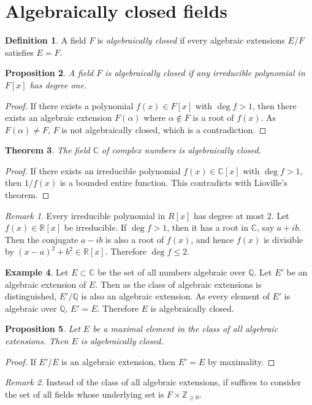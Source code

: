 \documentclass[12pt]{report}
\theoremstyle{plain}
\newtheorem{theorem}{Theorem}[section]
\newtheorem{proposition}[theorem]{Proposition}
\theoremstyle{remark}
\newtheorem*{remark}{Remark}
\theoremstyle{definition}
\newtheorem{definition}[theorem]{Definition}
\newtheorem{example}[theorem]{Example}
\newcommand{\Z}{\mathbb{Z}}
\newcommand{\Q}{\mathbb{Q}}
\newcommand{\R}{\mathbb{R}}
\newcommand{\C}{\mathbb{C}}
\begin{document}
\clearpage
\section{Algebraically closed fields}
\begin{definition}
    A field $F$ is \emph{algebraically closed} if every algebraic extensions $E/F$ satisfies $E=F$.
\end{definition}

\begin{proposition}
    A field $F$ is algebraically closed if any irreducible polynomial in $F[x]$ has degree one.
\end{proposition}
\begin{proof}
    If there exists a polynomial $f(x)\in F[x]$ with $\deg f>1$, then there exists an algebraic extension $F(\alpha)$ where $\alpha\not\in F$ is a root of $f(x)$. As $F(\alpha)\neq F$, $F$ is not algebraically closed, which is a contradiction.
\end{proof}

\begin{theorem}
    The field $\C$ of complex numbers is algebraically closed.
\end{theorem}
\begin{proof}
    If there exists an irreducible polynomial $f(x)\in\C[x]$ with $\deg f>1$, then $1/f(x)$ is a bounded entire function. This contradicts with Lioville's theorem.
\end{proof}
\begin{remark}
    Every irreducible polynomial in $R[x]$ has degree at most $2$. Let $f(x)\in \R[x]$ be irreducible. If $\deg f>1$, then it has a root in $\C$, say $a+ib$. Then the conjugate $a-ib$ is also a root of $f(x)$, and hence $f(x)$ is divisible by $(x-a)^2+b^2\in \R[x]$. Therefore $\deg f\le 2$.
\end{remark}

\begin{example}
    Let $E\subset\C$ be the set of all numbers algebraic over $\Q$. Let $E'$ be an algebraic extension of $E$. Then as the class of algebraic extensions is distinguished, $E'/\Q$ is also an algebraic extension. As every element of $E'$ is algebraic over $\Q$, $E'=E$. Therefore $E$ is algebraically closed.
\end{example}

\begin{proposition}
    Let $E$ be a maximal element in the class of all algebraic extensions. Then $E$ is algebraically closed.
\end{proposition}
\begin{proof}
    If $E'/E$ is an algebraic extension, then $E'=E$ by maximality.
\end{proof}
\begin{remark}
    Instead of the class of all algebraic extensions, if suffices to consider the set of all fields whose underlying set is $F\times\Z_{\ge 0}$.
\end{remark}
\end{document}
